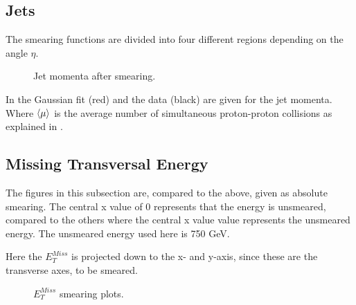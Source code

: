 \subsection{Jets}
The smearing functions are divided into four different regions depending on the angle $\eta$. 
 \begin{figure}[H] %
    \hfill
{}
    \hfill
    \hfill
{}
        \hfill
{}
            \hfill
{}
    \caption{Jet momenta after smearing.}
    \label{fig:jet}
\end{figure}
In  the Gaussian fit (red) and the data (black) are given for the jet momenta. Where $\left<\mu\right>$ is the average number of simultaneous proton-proton collisions as explained in .
\subsection{Missing Transversal Energy}
The figures in this subsection are, compared to the above, given as absolute smearing. The central x value of 0 represents that the energy is unsmeared, compared to the others where the central x value value represents the unsmeared energy. The unsmeared energy used here is 750 GeV.

Here the $E_T^{Miss}$ is projected down to the x- and y-axis, since these are the transverse axes, to be smeared. 
 \begin{figure}[H] %
    \hfill
        \hfill
   \caption{$E_T^{Miss}$ smearing plots.}
    \label{fig:MET}
  \end{figure}
\newpage
